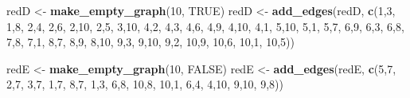 \documentclass[
]{article}
\newenvironment{Shaded}{\begin{snugshade}}{\end{snugshade}}
\newcommand{\ConstantTok}[1]{\textcolor[rgb]{0.56,0.35,0.01}{#1}}
\newcommand{\DecValTok}[1]{\textcolor[rgb]{0.00,0.00,0.81}{#1}}
\newcommand{\FunctionTok}[1]{\textcolor[rgb]{0.13,0.29,0.53}{\textbf{#1}}}
\newcommand{\NormalTok}[1]{#1}
\newcommand{\OtherTok}[1]{\textcolor[rgb]{0.56,0.35,0.01}{#1}}
\begin{document}
\begin{Shaded}
\begin{Highlighting}[]
\NormalTok{redD }\OtherTok{\textless{}{-}} \FunctionTok{make\_empty\_graph}\NormalTok{(}\DecValTok{10}\NormalTok{, }\ConstantTok{TRUE}\NormalTok{)}
\NormalTok{redD }\OtherTok{\textless{}{-}} \FunctionTok{add\_edges}\NormalTok{(redD, }\FunctionTok{c}\NormalTok{(}\DecValTok{1}\NormalTok{,}\DecValTok{3}\NormalTok{, }\DecValTok{1}\NormalTok{,}\DecValTok{8}\NormalTok{, }\DecValTok{2}\NormalTok{,}\DecValTok{4}\NormalTok{, }\DecValTok{2}\NormalTok{,}\DecValTok{6}\NormalTok{, }\DecValTok{2}\NormalTok{,}\DecValTok{10}\NormalTok{, }\DecValTok{2}\NormalTok{,}\DecValTok{5}\NormalTok{, }\DecValTok{3}\NormalTok{,}\DecValTok{10}\NormalTok{, }\DecValTok{4}\NormalTok{,}\DecValTok{2}\NormalTok{, }\DecValTok{4}\NormalTok{,}\DecValTok{3}\NormalTok{, }\DecValTok{4}\NormalTok{,}\DecValTok{6}\NormalTok{, }\DecValTok{4}\NormalTok{,}\DecValTok{9}\NormalTok{, }\DecValTok{4}\NormalTok{,}\DecValTok{10}\NormalTok{, }\DecValTok{4}\NormalTok{,}\DecValTok{1}\NormalTok{, }\DecValTok{5}\NormalTok{,}\DecValTok{10}\NormalTok{, }\DecValTok{5}\NormalTok{,}\DecValTok{1}\NormalTok{, }\DecValTok{5}\NormalTok{,}\DecValTok{7}\NormalTok{, }\DecValTok{6}\NormalTok{,}\DecValTok{9}\NormalTok{, }\DecValTok{6}\NormalTok{,}\DecValTok{3}\NormalTok{, }\DecValTok{6}\NormalTok{,}\DecValTok{8}\NormalTok{, }\DecValTok{7}\NormalTok{,}\DecValTok{8}\NormalTok{, }\DecValTok{7}\NormalTok{,}\DecValTok{1}\NormalTok{, }\DecValTok{8}\NormalTok{,}\DecValTok{7}\NormalTok{, }\DecValTok{8}\NormalTok{,}\DecValTok{9}\NormalTok{, }\DecValTok{8}\NormalTok{,}\DecValTok{10}\NormalTok{, }\DecValTok{9}\NormalTok{,}\DecValTok{3}\NormalTok{, }\DecValTok{9}\NormalTok{,}\DecValTok{10}\NormalTok{, }\DecValTok{9}\NormalTok{,}\DecValTok{2}\NormalTok{, }\DecValTok{10}\NormalTok{,}\DecValTok{9}\NormalTok{, }\DecValTok{10}\NormalTok{,}\DecValTok{6}\NormalTok{, }\DecValTok{10}\NormalTok{,}\DecValTok{1}\NormalTok{, }\DecValTok{10}\NormalTok{,}\DecValTok{5}\NormalTok{))}

\NormalTok{redE }\OtherTok{\textless{}{-}} \FunctionTok{make\_empty\_graph}\NormalTok{(}\DecValTok{10}\NormalTok{, }\ConstantTok{FALSE}\NormalTok{)}
\NormalTok{redE }\OtherTok{\textless{}{-}} \FunctionTok{add\_edges}\NormalTok{(redE, }\FunctionTok{c}\NormalTok{(}\DecValTok{5}\NormalTok{,}\DecValTok{7}\NormalTok{, }\DecValTok{2}\NormalTok{,}\DecValTok{7}\NormalTok{, }\DecValTok{3}\NormalTok{,}\DecValTok{7}\NormalTok{, }\DecValTok{1}\NormalTok{,}\DecValTok{7}\NormalTok{, }\DecValTok{8}\NormalTok{,}\DecValTok{7}\NormalTok{, }\DecValTok{1}\NormalTok{,}\DecValTok{3}\NormalTok{, }\DecValTok{6}\NormalTok{,}\DecValTok{8}\NormalTok{, }\DecValTok{10}\NormalTok{,}\DecValTok{8}\NormalTok{, }\DecValTok{10}\NormalTok{,}\DecValTok{1}\NormalTok{, }\DecValTok{6}\NormalTok{,}\DecValTok{4}\NormalTok{, }\DecValTok{4}\NormalTok{,}\DecValTok{10}\NormalTok{, }\DecValTok{9}\NormalTok{,}\DecValTok{10}\NormalTok{, }\DecValTok{9}\NormalTok{,}\DecValTok{8}\NormalTok{))}


\end{Highlighting}
\end{Shaded}
\end{document}
